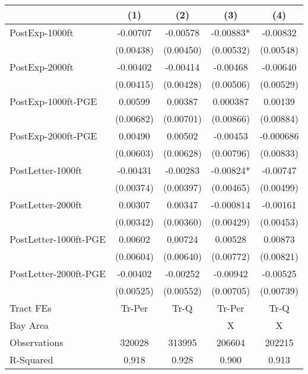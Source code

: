 {
\def\sym#1{\ifmmode^{#1}\else\(^{#1}\)\fi}
\begin{tabular}{l*{4}{c}}
\toprule
                    &\multicolumn{1}{c}{(1)}   &\multicolumn{1}{c}{(2)}   &\multicolumn{1}{c}{(3)}   &\multicolumn{1}{c}{(4)}   \\
\midrule
PostExp-1000ft      &    -0.00707   &    -0.00578   &    -0.00883*  &    -0.00832   \\
                    &   (0.00438)   &   (0.00450)   &   (0.00532)   &   (0.00548)   \\
\addlinespace
PostExp-2000ft      &    -0.00402   &    -0.00414   &    -0.00468   &    -0.00640   \\
                    &   (0.00415)   &   (0.00428)   &   (0.00506)   &   (0.00529)   \\
\addlinespace
PostExp-1000ft-PGE  &     0.00599   &     0.00387   &    0.000387   &     0.00139   \\
                    &   (0.00682)   &   (0.00701)   &   (0.00866)   &   (0.00884)   \\
\addlinespace
PostExp-2000ft-PGE  &     0.00490   &     0.00502   &    -0.00453   &   -0.000686   \\
                    &   (0.00603)   &   (0.00628)   &   (0.00796)   &   (0.00833)   \\
\addlinespace
PostLetter-1000ft   &    -0.00431   &    -0.00283   &    -0.00824*  &    -0.00747   \\
                    &   (0.00374)   &   (0.00397)   &   (0.00465)   &   (0.00499)   \\
\addlinespace
PostLetter-2000ft   &     0.00307   &     0.00347   &   -0.000814   &    -0.00161   \\
                    &   (0.00342)   &   (0.00360)   &   (0.00429)   &   (0.00453)   \\
\addlinespace
PostLetter-1000ft-PGE&     0.00602   &     0.00724   &     0.00528   &     0.00873   \\
                    &   (0.00604)   &   (0.00640)   &   (0.00772)   &   (0.00821)   \\
\addlinespace
PostLetter-2000ft-PGE&    -0.00402   &    -0.00252   &    -0.00942   &    -0.00525   \\
                    &   (0.00525)   &   (0.00552)   &   (0.00705)   &   (0.00739)   \\
\midrule
Tract FEs           &      Tr-Per   &        Tr-Q   &      Tr-Per   &        Tr-Q   \\
Bay Area            &               &               &           X   &           X   \\
Observations        &      320028   &      313995   &      206604   &      202215   \\
R-Squared           &       0.918   &       0.928   &       0.900   &       0.913   \\
\bottomrule
\end{tabular}
}
